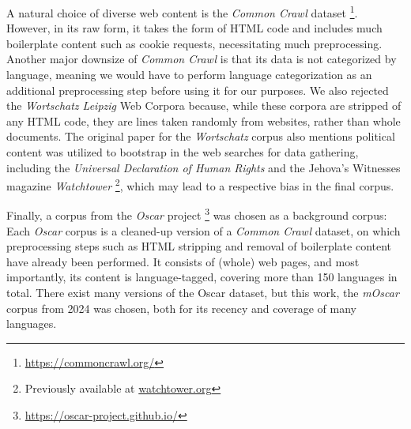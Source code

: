 A natural choice of diverse web content is the \textit{Common Crawl} dataset \footnote{\url{https://commoncrawl.org/}}.
However, in its raw form, it takes the form of HTML code and includes much boilerplate content such as cookie requests, necessitating much preprocessing.
Another major downsize of \textit{Common Crawl} is that its data is not categorized by language, meaning we would have to perform language categorization as an additional preprocessing step before using it for our purposes.
We also rejected the \textit{Wortschatz Leipzig} Web Corpora because, while these corpora are stripped of any HTML code, they are lines taken randomly from websites, rather than whole documents.
The original paper for the \textit{Wortschatz} corpus also mentions political content was utilized to bootstrap in the web searches for data gathering, including the \textit{Universal Declaration of Human Rights} and the Jehova's Witnesses magazine \textit{Watchtower} \footnote{Previously available at \url{watchtower.org}}, which may lead to a respective bias in the final corpus.

Finally, a corpus from the \textit{Oscar} project \footnote{\url{https://oscar-project.github.io/}} was chosen as a background corpus:
Each \textit{Oscar} corpus is a cleaned-up version of a \textit{Common Crawl} dataset, on which preprocessing steps such as HTML stripping and removal of boilerplate content have already been performed.
It consists of (whole) web pages, and most importantly, its content is language-tagged, covering more than 150 languages in total.
There exist many versions of the Oscar dataset, but this work, the \textit{mOscar} \cite{futeralMOSCARLargescaleMultilingual2024} corpus from 2024 was chosen, both for its recency and coverage of many languages.


